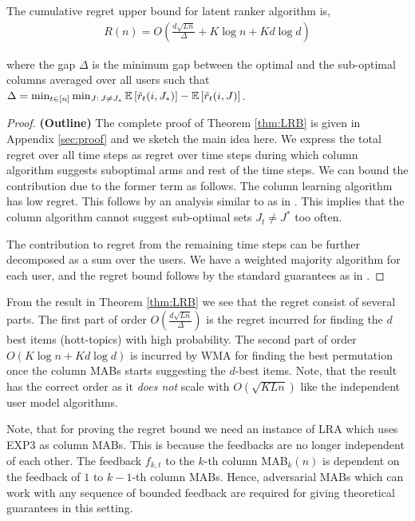 \begin{theorem}
\label{thm:LRB}
The cumulative regret upper bound for latent ranker algorithm is,
\begin{align*}
 R(n) = O\left(\frac{d \sqrt{L n}}{\Delta} + K \log n + K d \log d\right)
\end{align*}

where the gap $\Delta$ is the minimum gap between the optimal and the sub-optimal columns averaged over all users such that $\Delta =
  \min_{t \in [n]} \min_{J:\, J \neq J_\ast} \mathbb{E}\left[\tilde{r}_t(i, J_\ast)\right] - \mathbb{E}\left[\tilde{r}_t(i, J)\right]$.
\end{theorem}


\begin{proof} \textbf{(Outline)}
The complete proof of Theorem \ref{thm:LRB} is given in Appendix \ref{sec:proof} and we sketch the main idea here.  We  express the total regret over all time steps as regret over time steps during which column algorithm suggests suboptimal arms and rest of the time steps. We can bound the contribution due to the former term as follows. The column learning algorithm has  low regret. This follows by an analysis similar to as in \cite{radlinski2008learning}. This implies that the column algorithm cannot suggest sub-optimal sets $J_t \neq J^*$ too often. 

The contribution to regret from the remaining time steps can be further decomposed as a sum over the users. We have a weighted majority algorithm for each user, and the regret bound follows by the standard guarantees as in \citet{littlestone1994weighted}.
\end{proof}

\begin{discussion}
\label{disc:proof1}
From the result in Theorem \ref{thm:LRB} we see that the regret consist of several parts. The first part of order $O\left(\frac{d \sqrt{L n}}{\Delta} \right)$ is the regret incurred for finding the $d$ best items (hott-topics) with high probability. The second part of order $O\left( K\log n + K d \log d\right)$ is incurred by WMA for finding the best permutation once the column MABs starts suggesting the $d$-best items. Note, that the result has the correct order as it \textit{does not} scale with $O\left(\sqrt{KLn}\right)$ like the independent user model algorithms.
\end{discussion}

\begin{discussion}
\label{disc:proof2}
Note, that for proving the regret bound we need an instance of LRA which uses EXP3 \citep{auer2002finite} as column MABs. This is because the feedbacks are no longer independent of each other. The feedback $f_{k,t}$ to the $k$-th column MAB$_k(n)$  is dependent on the feedback of $1$ to $k-1$-th column MABs. Hence, adversarial MABs which can work with any sequence of bounded feedback are required for giving theoretical guarantees in this setting.
\end{discussion}
